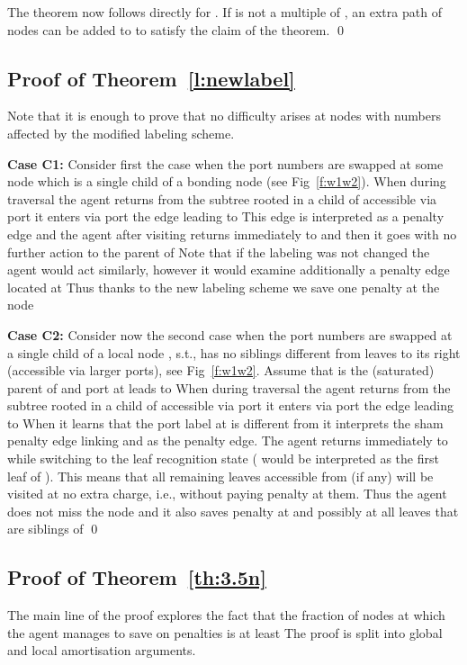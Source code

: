 \documentclass[11pt,envcountsame,oribibl]{llncs}
\begin{document}
The theorem now follows directly for . If  is not a multiple of
, an extra path of  nodes can be added to  to satisfy the
claim of the theorem. \hfill\qed


\subsection{Proof of Theorem~\ref{l:newlabel}}
Note that it is enough to prove that no difficulty arises at nodes with
numbers affected by the modified labeling scheme.

\noindent
{\bf Case C1:}
Consider first the case when the port numbers are swapped at some node
 which is
a single child of a bonding node  (see Fig~\ref{f:w1w2}).
When during traversal the agent returns from the subtree rooted in a
child of  accessible
via port  it enters via port  the edge leading to  This edge
is interpreted as
a penalty edge and the agent after visiting  returns immediately to
 and then it goes
with no further action to the parent of  Note that if the labeling
was not changed the agent
would act similarly, however it would examine additionally a penalty
edge located at 
Thus thanks to the new labeling scheme we save one penalty at the node 


\noindent
{\bf Case C2:}
Consider now the second case when the port numbers are swapped at a
single child 
of a local node , s.t.,  has no siblings different from leaves
to its right (accessible via larger ports), see Fig~\ref{f:w1w2}.
Assume that  is the (saturated) parent of  and port
 at  leads to 
When during traversal the agent returns from the subtree
rooted in a child of  accessible via port  it enters via port
 the edge leading
to 
When it learns that
the port label at  is different from  it interprets the sham
penalty edge linking
 and  as the penalty edge. The agent returns immediately to 
while switching to the leaf recognition state ( would be interpreted as
the first leaf of ).
This means that all remaining leaves accessible from  (if any) will
be visited at no extra charge, i.e., without paying penalty at them.
Thus the agent does not miss the node  and it also saves penalty
at  and possibly at all leaves that are siblings of  \hfill\qed




\subsection{\bf Proof of Theorem~\ref{th:3.5n}}
The main line of the proof explores the fact that the fraction of nodes
at which the agent
manages to save on penalties is at least  The proof is
split into global
and local amortisation arguments.
\end{document}

